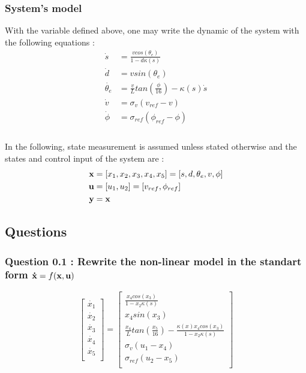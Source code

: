 \subsubsection*{System's model}
With the variable defined above, one may write the dynamic of the system with the following equations :
\begin{align}
    \dot{s} &= \frac{v cos(\theta_e)}{1 - d\kappa(s)}\\
    \dot{d} &= v sin(\theta_e)\\
    \dot{\theta_e} &= \frac{v}{L}tan(\frac{\phi}{16}) - \kappa(s)\dot{s}\\
    \dot{v} &= \sigma_v (v_{ref} - v)\\
    \dot{\phi} &= \sigma_{ref} (\phi_{ref} - \phi)\\
\end{align}
\\
In the following, state measurement is assumed unless stated otherwise and the states and control input of the system are :
\begin{align}
    \bold{x} &= [x_1, x_2, x_3, x_4, x_5] = [s,d,\theta_e, v, \phi]\\
    \bold{u} &= [u_1, u_2] = [v_{ref}, \phi_{ref}]\\
    \bold{y} &= \bold{x}
\end{align}


\subsection{Questions}
\subsubsection*{Question 0.1 : Rewrite the non-linear model in the standart form $\bold{\dot{x}} = f(\bold{x}, \bold{u})$}
\begin{equation}
    \left[ {\begin{array}{c}
        \dot{x_1}\\
        \dot{x_2}\\
        \dot{x_3}\\
        \dot{x_4}\\
        \dot{x_5}\\
    \end{array} } \right]
    =
    \left[ {\begin{array}{c}
        \frac{x_4 cos(x_3)}{1 - x_2\kappa(s)}\\
        x_4 sin(x_3)\\
        \frac{x_4}{L}tan(\frac{x_5}{16}) - \frac{\kappa(x) x_4 cos(x_3)}{1 - x_2 \kappa(s)}\\
        \sigma_v (u_1 - x_4)\\
        \sigma_{ref} (u_2 - x_5)\\
    \end{array} } \right]
\end{equation}



